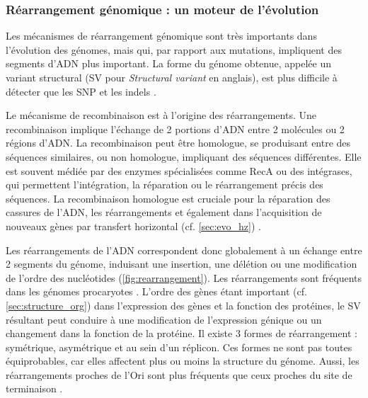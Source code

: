\subsubsection{Réarrangement génomique : un moteur de l'évolution}
\label{sec:rearragement}
Les mécanismes de réarrangement génomique sont très importants dans l'évolution des génomes, mais qui, par rapport aux mutations, impliquent des segments d'ADN plus important. La forme du génome obtenue, appelée un variant structural (SV pour \textit{Structural variant} en anglais), est plus difficile à détecter que les SNP et les indels \cite{periwal_insights_2015}.

Le mécanisme de recombinaison est à l'origine des réarrangements. Une recombinaison implique l'échange de 2 portions d'ADN entre 2 molécules ou 2 régions d'ADN. La recombinaison peut être homologue, se produisant entre des séquences similaires, ou non homologue, impliquant des séquences différentes. Elle est souvent médiée par des enzymes spécialisées comme RecA ou des intégrases, qui permettent l'intégration, la réparation ou le réarrangement précis des séquences. La recombinaison homologue est cruciale pour la réparation des cassures de l'ADN, les réarrangements et également dans l'acquisition de nouveaux gènes par transfert horizontal (cf. \autoref{sec:evo_hz}) \cite{eisenstark_genetic_1977}.

Les réarrangements de l'ADN correspondent donc globalement à un échange entre 2 segments du génome, induisant une insertion, une délétion ou une modification de l'ordre des nucléotides (\autoref{fig:rearrangement}). Les réarrangements sont fréquents dans les génomes procaryotes \cite{sun_genome-wide_2012}. L'ordre des gènes étant important (cf. \autoref{sec:structure_org}) dans l'expression des gènes et la fonction des protéines, le SV résultant peut conduire à une modification de l'expression génique ou un changement dans la fonction de la protéine. Il existe 3 formes de réarrangement : symétrique, asymétrique et au sein d'un réplicon. Ces formes ne sont pas toutes équiprobables, car elles affectent plus ou moins la structure du génome. Aussi, les réarrangements proches de l'Ori sont plus fréquents que ceux proches du site de terminaison \cite{darling_dynamics_2008}. 

